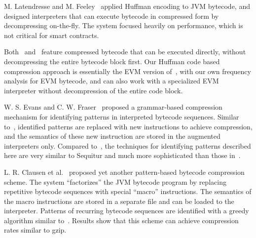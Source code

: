 M. Latendresse and M. Feeley~\cite{marc2003} applied Huffman encoding to JVM bytecode, and designed interpreters that
can execute bytecode in compressed form by decompressing on-the-fly.
The system focused heavily on performance, which is not critical for \eth{} smart contracts.

Both~\cite{aslam2010} and~\cite{marc2003} feature compressed bytecode that can be executed directly, without decompressing
the entire bytecode block first. Our Huffman code based compression approach is essentially the EVM version of~\cite{marc2003},
with our own frequency analysis for EVM bytecode, and can also work with a specialized
EVM interpreter without decompression of the entire code block.

W. S. Evans and C. W. Fraser~\cite{evans2003} proposed a grammar-based compression mechanism for identifying patterns in
interpreted bytecode sequences.
Similar to~\cite{aslam2010}, identified patterns are replaced with new instructions to achieve compression, and the semantics
of these new instruction are stored in the augmented interpreters only. Compared to~\cite{aslam2010}, the techniques for
identifying patterns described here are very similar to Sequitur and much more sophisticated than those in~\cite{aslam2010}.

L. R. Clausen et al.~\cite{clausen2000} proposed yet another pattern-based bytecode compression scheme. The system ``factorizes''
the JVM bytecode program by replacing repetitive bytecode sequences with special ``macro'' instructions. The semantics of the
macro instructions are stored in a separate file and can be loaded to the interpreter. Patterns of recurring bytecode sequences
are identified with a greedy algorithm similar to~\cite{aslam2010}. Results show that this scheme can achieve compression rates
similar to gzip.

